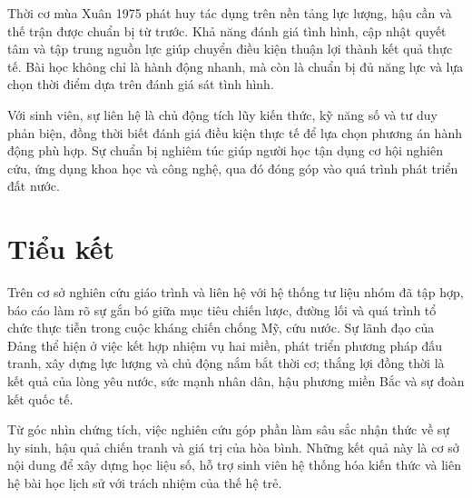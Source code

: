 Thời cơ mùa Xuân 1975 phát huy tác dụng trên nền tảng lực lượng, hậu cần và thế trận được chuẩn bị từ trước. Khả năng đánh giá tình hình, cập nhật quyết tâm và tập trung nguồn lực giúp chuyển điều kiện thuận lợi thành kết quả thực tế. Bài học không chỉ là hành động nhanh, mà còn là chuẩn bị đủ năng lực và lựa chọn thời điểm dựa trên đánh giá sát tình hình.

Với sinh viên, sự liên hệ là chủ động tích lũy kiến thức, kỹ năng số và tư duy phản biện, đồng thời biết đánh giá điều kiện thực tế để lựa chọn phương án hành động phù hợp. Sự chuẩn bị nghiêm túc giúp người học tận dụng cơ hội nghiên cứu, ứng dụng khoa học và công nghệ, qua đó đóng góp vào quá trình phát triển đất nước.

\section{Tiểu kết}

Trên cơ sở nghiên cứu giáo trình và liên hệ với hệ thống tư liệu nhóm đã tập hợp, báo cáo làm rõ sự gắn bó giữa mục tiêu chiến lược, đường lối và quá trình tổ chức thực tiễn trong cuộc kháng chiến chống Mỹ, cứu nước. Sự lãnh đạo của Đảng thể hiện ở việc kết hợp nhiệm vụ hai miền, phát triển phương pháp đấu tranh, xây dựng lực lượng và chủ động nắm bắt thời cơ; thắng lợi đồng thời là kết quả của lòng yêu nước, sức mạnh nhân dân, hậu phương miền Bắc và sự đoàn kết quốc tế.

Từ góc nhìn chứng tích, việc nghiên cứu góp phần làm sâu sắc nhận thức về sự hy sinh, hậu quả chiến tranh và giá trị của hòa bình. Những kết quả này là cơ sở nội dung để xây dựng học liệu số, hỗ trợ sinh viên hệ thống hóa kiến thức và liên hệ bài học lịch sử với trách nhiệm của thế hệ trẻ.

\clearpage
